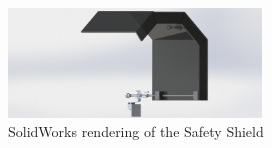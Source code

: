 \begin{figure}[hbp]
    \centering
    \includegraphics[width=0.6\textwidth]{./images/Chapter2-MachineDescription/Shield}
    \caption{SolidWorks rendering of the Safety Shield}
    \label{fig:Control Panel}
\end{figure} 